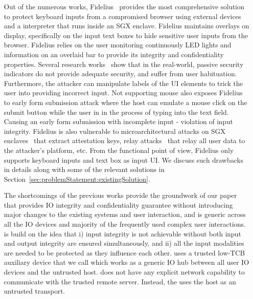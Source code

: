 Out of the numerous works, Fidelius~\cite{Fidelius} provides the most comprehensive solution to protect keyboard inputs from a compromised browser using external devices and a \js interpreter that runs inside an SGX enclave. Fidelius maintains overlays on display, specifically on the input text boxes to hide sensitive user inputs from the browser. Fidelius relies on the user monitoring continuously LED lights and information on an overlaid bar to provide its integrity and confidentiality properties. Several research works~\cite{egelman2008you,sobey2008exploring} show that in the real-world, passive security indicators do not provide adequate security, and suffer from user habituation. Furthermore, the attacker can manipulate labels of the UI elements to trick the user into providing incorrect input. Not supporting mouse also exposes Fidelius to early form submission attack where the host can emulate a mouse click on the submit button while the user in in the process of typing into the text field. Causing an early form submission with incomplete input - violation of input integrity. Fidelius is also vulnerable to  microarchitectural attacks on SGX enclaves~\cite{van2018foreshadow} that extract attestation keys, relay attacks~\cite{dhar2018proximitee} that relay all user data to the attacker's platform, etc. From the functional point of view, Fidelius only supports keyboard inputs and text box as input UI. We discuss such drawbacks in details along with some of the relevant solutions in Section~\ref{sec:problemStatement:existingSolution}. 
 
 
 The shortcomings of the previous works provide the groundwork of our paper \name that provides IO integrity and confidentiality guarantee without introducing major changes to the existing systems and user interaction, and is generic across all the IO devices and majority of the frequently used complex user interactions. \name is build on the idea that i) input integrity is not achievable without both input and output integrity are ensured simultaneously, and ii) all the input modalities are needed to be protected as they influence each other. \name uses a trusted low-TCB auxiliary device that we call \device which works as a generic IO hub between all user IO devices and the untrusted host. \device does not have any explicit network capability to communicate with the trusted remote server. Instead, the \device uses the host as an untrusted transport. 


